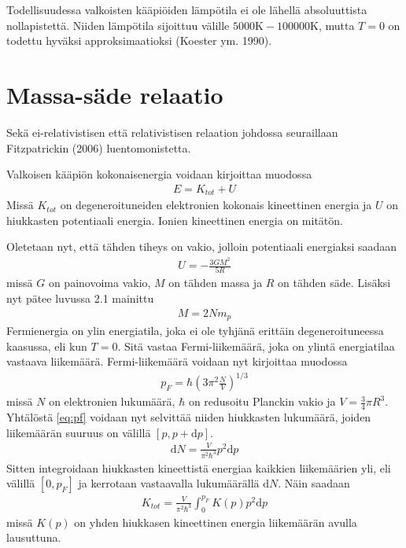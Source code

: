 \documentclass[12pt,a4paper,titlepage]{article}
\begin{document}
Todellisuudessa valkoisten kääpiöiden lämpötila ei ole lähellä absoluuttista nollapistettä. Niiden lämpötila sijoittuu välille $5000 \mathrm{K}-100000 \mathrm{K}$, mutta $T = 0$ on todettu hyväksi approksimaatioksi (Koester ym. 1990).\\


\section{Massa-säde relaatio}

Sekä ei-relativistisen että relativistisen relaation johdossa seuraillaan Fitzpatrickin (2006) luentomonistetta. 

Valkoisen kääpiön kokonaisenergia voidaan kirjoittaa muodossa
\begin{align}
E = K_{tot} + U \label{eq:e}
\end{align}
Missä $K_{tot}$ on degeneroituneiden elektronien kokonais kineettinen energia ja $U$ on hiukkasten potentiaali energia. Ionien kineettinen energia on mitätön. 

Oletetaan nyt, että tähden tiheys on vakio, jolloin potentiaali energiaksi saadaan 
\begin{align}
U = -\frac{3 G M ^2}{5 R} \label{eq:u}
\end{align}
missä $G$ on painovoima vakio, $M$ on tähden massa ja $R$ on tähden säde. Lisäksi nyt pätee luvussa 2.1 mainittu 
\begin{align}
M = 2 N m_p \label{eq:m}
\end{align}
Fermienergia on ylin energiatila, joka ei ole tyhjänä erittäin degeneroituneessa kaasussa, eli kun $T = 0$. Sitä vastaa Fermi-liikemäärä, joka on ylintä energiatilaa vastaava liikemäärä. Fermi-liikemäärä voidaan nyt kirjoittaa muodossa
\begin{align}
p_F = \hbar \left( 3 \pi^2 \frac{N}{V} \right)^{1/3} \label{eq:pf}
\end{align}
missä $N$ on elektronien lukumäärä, $\hbar$ on redusoitu Planckin vakio ja $V = \frac{3}{4} \pi R^3$. Yhtälöstä \eqref{eq:pf} voidaan nyt selvittää niiden hiukkasten lukumäärä, joiden liikemäärän suuruus on välillä $[p, p+\mathrm{d}p]$.
\begin{align}
\mathrm{d}N = \frac{V}{\pi^2 \hbar^3} p^2 \mathrm{d}p
\end{align}
Sitten integroidaan hiukkasten kineettistä energiaa kaikkien liikemäärien yli, eli välillä $[0, p_F]$ ja kerrotaan vastaavalla lukumäärällä $\mathrm{d}N$. Näin saadaan
\begin{align}
K_{tot} = \frac{V}{\pi^2 \hbar^3} \int_0^{p_F} K(p) p^2 \mathrm{d}p \label{eq:k}
\end{align}
missä $K(p)$ on yhden hiukkasen kineettinen energia liikemäärän avulla lausuttuna.
\end{document}
